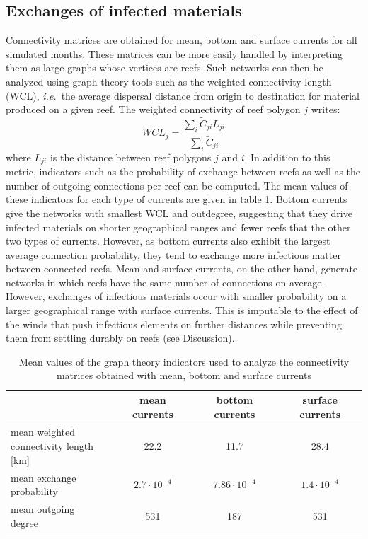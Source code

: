 \documentclass[utf8]{frontiersSCNS}
\newcommand{\ie}{{\it i.e.}\ }
\begin{document}
\subsection{Exchanges of infected materials}
Connectivity matrices are obtained for mean, bottom and surface currents for all simulated months. These matrices can be more easily handled by interpreting them as large graphs whose vertices are reefs. Such networks can then be analyzed using graph theory tools such as the weighted connectivity length (WCL), \ie the average dispersal distance from origin to destination for material produced on a given reef. The weighted connectivity of reef polygon $j$ writes:
\begin{equation}
    WCL_j = \dfrac{\sum_i \tilde{C}_{ji} L_{ji}}{\sum_i \tilde{C}_{ji}}
\end{equation}
where $L_{ji}$ is the distance between reef polygons $j$ and $i$. In addition to this metric, indicators such as the probability of exchange between reefs as well as the number of outgoing connections per reef can be computed. The mean values of these indicators for each type of currents are given in table \ref{tab:connect}. Bottom currents give the networks with smallest WCL and outdegree, suggesting that they drive infected materials on shorter geographical ranges and fewer reefs that the other two types of currents. However, as bottom currents also exhibit the largest average connection probability, they tend to exchange more infectious matter between connected reefs. Mean and surface currents, on the other hand, generate networks in which reefs have the same number of connections on average. However, exchanges of infectious materials occur with smaller probability on a  larger geographical range with surface currents. This is imputable to the effect of the winds that push infectious elements on further distances while preventing them from settling durably on reefs (see Discussion).

\begin{table}
    \centering
    \begin{tabular}{|l|c|c|c|}
        \hline
                                    & mean currents      & bottom currents     & surface currents   \\
        \hline
        \makecell{mean weighted \\
        connectivity length [km]}   & 22.2               & 11.7                & 28.4               \\
        \hline
        \makecell{mean exchange \\
        probability}                & $2.7\cdot 10^{-4}$ & $7.86\cdot 10^{-4}$ & $1.4\cdot 10^{-4}$ \\
        \hline
        \makecell{mean outgoing \\
        degree}                     & 531                & 187                 & 531                \\
        \hline
    \end{tabular}
    \caption{Mean values of the graph theory indicators used to analyze the connectivity matrices obtained with mean, bottom and surface currents}
    \label{tab:connect}
\end{table}
\end{document}
